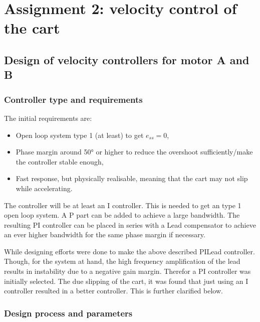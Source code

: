 \documentclass[a4paper]{article}
\newcommand{\newpar}{\vspace{.3cm}\noindent}
\begin{document}

\section{Assignment 2: velocity control of the cart}

\subsection{Design of velocity controllers for motor A and B}

\subsubsection{Controller type and requirements}

The initial requirements are:

\begin{itemize}
  \item Open loop system type 1 (at least) to get \(e_{ss} = 0\),
  \item Phase margin around 50° or higher to reduce the overshoot sufficiently/make the controller stable enough,
  \item Fast response, but physically realisable, meaning that the cart may not slip while accelerating.
\end{itemize}

\newpar
The controller will be at least an I controller. This is needed to get an type 1 open loop system. A P part can be added to achieve a large bandwidth. The resulting PI controller can be placed in series with a Lead compensator to achieve an ever higher bandwidth for the same phase margin if necessary. 

\newpar
While designing efforts were done to make the above described PILead controller. Though, for the system at hand, the high frequency amplification of the lead results in instability due to a negative gain margin. Therefor a PI controller was initially selected. The due slipping of the cart, it was found that just using an I controller resulted in a better controller. This is further clarified below.

\subsubsection{Design process and parameters}
\end{document}
